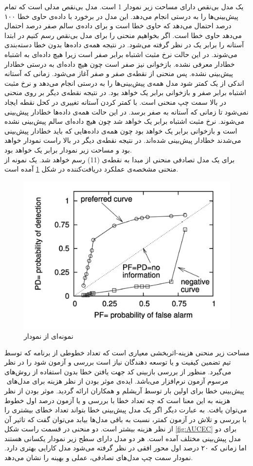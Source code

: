 یک مدل بی‌نقص دارای مساحت زیر نمودار 1 است.  مدل بی‌نقص مدلی است که تمام پیش‌بینی‌ها را به درستی انجام می‌دهد. این مدل  در برخورد با داده‌ی حاوی خطا ۱۰۰ درصد احتمال می‌دهد که حاوی خطا است  و برای داده‌ی سالم صفر درصد احتمال می‌دهد حاوی خطا است. اگر بخواهیم منحنی را برای مدل بی‌نقص رسم کنیم در ابتدا آستانه  را برابر یک  در نظر گرفته می‌شود. در نتیجه همه‌ی داده‌ها بدون خطا دسته‌بندی می‌شوند. در این حالت نرخ مثبت اشتباه برابر صفر است زیرا هیچ داده‌ای به اشتباه خطادار معرفی نشده. بازخوانی نیز صفر است چون هیچ داده‌ای به درستی خطادار پیش‌بینی نشده. پس منحنی از نقطه‌ی صفر و صفر آغاز می‌شود. زمانی که آستانه اندکی از یک کمتر شود مدل همه‌ی پیش‌بینی‌ها را به درستی انجام می‌دهد و نرخ مثبت اشتباه برابر صفر و بازخوانی برابر یک خواهد بود. در نتیجه نقطه‌ی دیگر  بر روی منحنی در بالا سمت چپ منحنی است. با کمتر کردن آستانه تغییری در کحل نقطه ایجاد نمی‌شود تا زمانی که آستانه به صفر برسد. در این حالت همه‌ی داده‌ها خطادار پیش‌بینی می‌شوند. نرخ مثبت اشتباه برابر یک خواهد شد چون هیچ داده‌ای سالم پیش‌بینی نشده است و بازخوانی برابر یک خواهد بود چون همه‌ی داده‌هایی که باید خطادار پیش‌بینی می‌شدند خطا‌دار پیش‌بینی شده‌اند. در نتیجه نقطه‌ی دیگر در بالا راست نمودار خواهد بود و مساحت زیر نمودار برابر یک خواهد بود. \\

برای یک مدل تصادفی  منحنی از مبدا به نقطه‌ی (1\lr{,}1) رسم خواهد شد. یک نمونه از منحنی مشخصه‌ی عملکرد دریافت‌کننده در شکل \ref{fig:ROC} آمده است. \\

\begin{figure}
	\centering
	\includegraphics[width=.60\textwidth]{img/ROC.PNG}
	\caption{ نمونه‌ای از نمودار  \cite{menzies2007data}}
	\label{fig:ROC}
\end{figure}

 مساحت زیر منحنی هزینه-اثربخشی معیاری است که تعداد خطوطی از برنامه که  توسط تیم تضمین کیفیت و یا توسعه دهندگان نیاز است بررسی و آزمون شود را در نظر می‌گیرد. منظور از بررسی بازبینی کد جهت یافتن خطا بدون استفاده از روش‌های مرسوم آزمون نرم‌افزار می‌باشد. ایده‌ی  موثر بودن از نظر هزینه
برای مدل‌های ‌‌ پیش‌بینی خطا برای اولین بار توسط آریشلم و همکاران \cite{arisholm2007data} ارائه گردید. موثر بودن از نظر هزینه به این معنا است که چه تعداد خطا با بررسی و یا آزمون    درصد اول خطوط می‌توان یافت. به عبارت دیگر اگر یک مدل پیش‌بینی خطا بتواند تعداد خطای بیشتری را با بررسی و تلاش در آزمون کمتر، نسبت به باقی مدل‌ها بیابد می‌توان گفت که تاثیر آن از نظر هزینه بیشتر است. دو منحنی در  قسمت راست شکل \ref{fig:AUCEC} برای دو مدل پیش‌بینی مختلف آمده است. هر دو مدل دارای سطح زیر نمودار یکسانی هستند اما زمانی که ۲۰ درصد اول محور افقی در نظر گرفته می‌شود مدل 
  کارایی بهتری دارد. نمودار سمت چپ مدل‌های تصادفی، عملی و بهینه را نشان می‌دهد.

